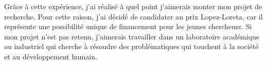 \documentclass[16pt]{article}
\begin{document}
	Grâce à cette expérience, j'ai réalisé à quel point j'aimerais monter mon projet de recherche. Pour cette raison, j'ai décidé de candidater au prix Lopez-Loreta, car il représente une possibilité unique de financement pour les jeunes chercheurs. Si mon projet n'est pas retenu, j'aimerais travailler dans un laboratoire académique ou industriel qui cherche à résoudre des problématiques qui touchent à la société et au développement humain.
\end{document}

